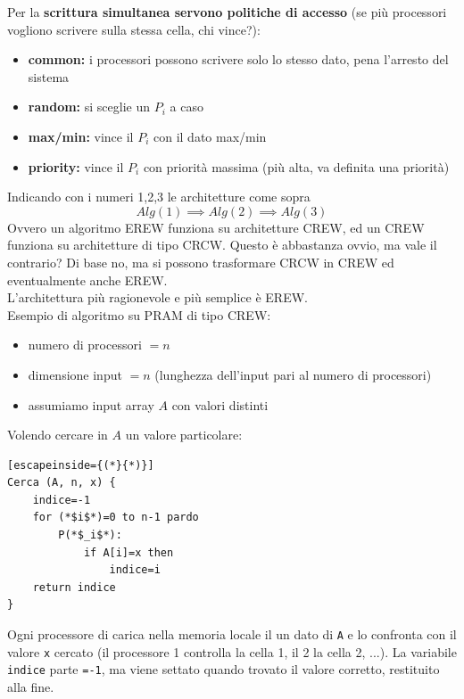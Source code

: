 \documentclass[11pt]{article}
\begin{document}
	\newpage
	
	Per la \textbf{scrittura simultanea servono politiche di accesso} (se più processori vogliono scrivere sulla stessa cella, chi vince?): 
	\begin{itemize}
		\item \textbf{common:} i processori possono scrivere solo lo stesso dato, pena l'arresto del sistema
		\item \textbf{random:} si sceglie un $P_i$ a caso 
		\item \textbf{max/min:} vince il $P_i$ con il dato max/min
		\item \textbf{priority:} vince il $P_i$ con priorità massima (più alta, va definita una priorità)
	\end{itemize}
	
	Indicando con i numeri 1,2,3 le architetture come sopra
	$$ Alg(1) \implies Alg(2) \implies Alg(3)$$
	Ovvero un algoritmo EREW funziona su architetture CREW, ed un CREW funziona su architetture di tipo CRCW. Questo è abbastanza ovvio, ma vale il contrario? Di base no, ma si possono trasformare CRCW in CREW ed eventualmente anche EREW.\\
	
	L'architettura più ragionevole e più semplice è EREW.\\
	
	Esempio di algoritmo su PRAM di tipo CREW:
	\begin{itemize}
		\item numero di processori $=n$
		\item dimensione input $=n$ (lunghezza dell'input pari al numero di processori)
		\item assumiamo input array $A$ con valori distinti
	\end{itemize}
	
	Volendo cercare in $A$ un valore particolare:
	\begin{lstlisting}[escapeinside={(*}{*)}]
Cerca (A, n, x) {
	indice=-1
	for (*$i$*)=0 to n-1 pardo 
		P(*$_i$*): 
			if A[i]=x then 
				indice=i
	return indice
}
	\end{lstlisting}
	
	\newpage
	
	Ogni processore di carica nella memoria locale il un dato di \texttt{A} e lo confronta con il valore \texttt{x} cercato (il processore 1 controlla la cella 1, il 2 la cella 2, ...). La variabile \texttt{indice} parte \texttt{=-1}, ma viene settato quando trovato il valore corretto, restituito alla fine.\\
	
\end{document}
